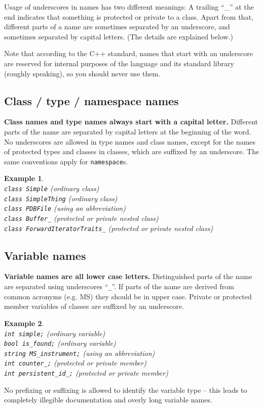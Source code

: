 \documentclass[a4]{article}
\newtheorem{example}{Example}
\begin{document}
Usage of underscores in names has two different meanings: A trailing ``\_'' at
the end indicates that something is protected or private to a class.  Apart
from that, different parts of a name are sometimes separated by an underscore,
and sometimes separated by capital letters.  (The details are explained below.)

Note that according to the C++ standard, names that start with an underscore
are reserved for internal purposes of the language and its standard library
(roughly speaking), so you should never use them.


\subsection{Class / type / namespace names}

\textbf{Class names and type names always start with a capital letter.}
Different parts of the name are separated by capital letters at the beginning
of the word. No underscores are allowed in type names and class names, except
for the names of protected types and classes in classes, which are suffixed by
an underscore.  The same conventions apply for \texttt{namespace}s.
\begin{example}~\\
  {\tt class Simple} (ordinary class)\\
  {\tt class SimpleThing} (ordinary class)\\
  {\tt class PDBFile} (using an abbreviation)\\
  {\tt class Buffer\_} (protected or private nested class)\\
  {\tt class ForwardIteratorTraits\_} (protected or private nested class)
\end{example}


\subsection{Variable names}

\textbf{Variable names are all lower case letters.}  Distinguished parts of
the name are separated using underscores ``{\tt \_}''. If parts of the name
are derived from common acronyms (e.g. MS) they should be in upper case.
Private or protected member variables of classes are suffixed by an
underscore.
\begin{example}~\\
  {\tt int simple;} (ordinary variable)\\
  {\tt bool is\_found;} (ordinary variable)\\
  {\tt string MS\_instrument;} (using an abbreviation)\\
  {\tt int counter\_;} (protected or private member)\\
  {\tt int persistent\_id\_;} (protected or private member)
\end{example}
No prefixing or suffixing is allowed to identify the variable type -- this
leads to completely illegible documentation and overly long variable names.
\end{document}
